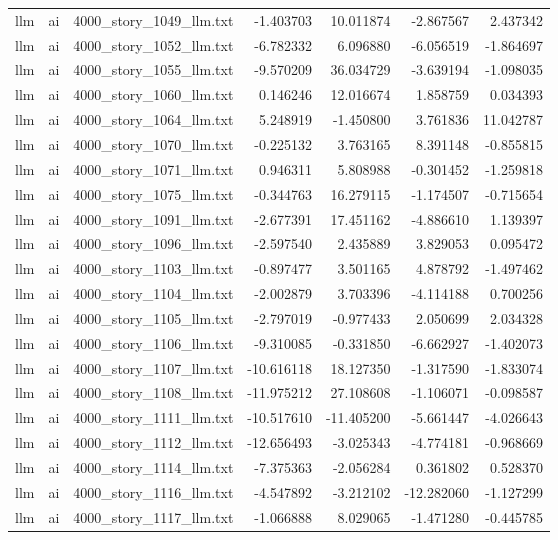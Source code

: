 \begin{longtable}{lllrrrr}
llm & ai & 4000\_story\_1049\_llm.txt & -1.403703 & 10.011874 & -2.867567 & 2.437342 \\
llm & ai & 4000\_story\_1052\_llm.txt & -6.782332 & 6.096880 & -6.056519 & -1.864697 \\
llm & ai & 4000\_story\_1055\_llm.txt & -9.570209 & 36.034729 & -3.639194 & -1.098035 \\
llm & ai & 4000\_story\_1060\_llm.txt & 0.146246 & 12.016674 & 1.858759 & 0.034393 \\
llm & ai & 4000\_story\_1064\_llm.txt & 5.248919 & -1.450800 & 3.761836 & 11.042787 \\
llm & ai & 4000\_story\_1070\_llm.txt & -0.225132 & 3.763165 & 8.391148 & -0.855815 \\
llm & ai & 4000\_story\_1071\_llm.txt & 0.946311 & 5.808988 & -0.301452 & -1.259818 \\
llm & ai & 4000\_story\_1075\_llm.txt & -0.344763 & 16.279115 & -1.174507 & -0.715654 \\
llm & ai & 4000\_story\_1091\_llm.txt & -2.677391 & 17.451162 & -4.886610 & 1.139397 \\
llm & ai & 4000\_story\_1096\_llm.txt & -2.597540 & 2.435889 & 3.829053 & 0.095472 \\
llm & ai & 4000\_story\_1103\_llm.txt & -0.897477 & 3.501165 & 4.878792 & -1.497462 \\
llm & ai & 4000\_story\_1104\_llm.txt & -2.002879 & 3.703396 & -4.114188 & 0.700256 \\
llm & ai & 4000\_story\_1105\_llm.txt & -2.797019 & -0.977433 & 2.050699 & 2.034328 \\
llm & ai & 4000\_story\_1106\_llm.txt & -9.310085 & -0.331850 & -6.662927 & -1.402073 \\
llm & ai & 4000\_story\_1107\_llm.txt & -10.616118 & 18.127350 & -1.317590 & -1.833074 \\
llm & ai & 4000\_story\_1108\_llm.txt & -11.975212 & 27.108608 & -1.106071 & -0.098587 \\
llm & ai & 4000\_story\_1111\_llm.txt & -10.517610 & -11.405200 & -5.661447 & -4.026643 \\
llm & ai & 4000\_story\_1112\_llm.txt & -12.656493 & -3.025343 & -4.774181 & -0.968669 \\
llm & ai & 4000\_story\_1114\_llm.txt & -7.375363 & -2.056284 & 0.361802 & 0.528370 \\
llm & ai & 4000\_story\_1116\_llm.txt & -4.547892 & -3.212102 & -12.282060 & -1.127299 \\
llm & ai & 4000\_story\_1117\_llm.txt & -1.066888 & 8.029065 & -1.471280 & -0.445785 \\

\end{longtable}
